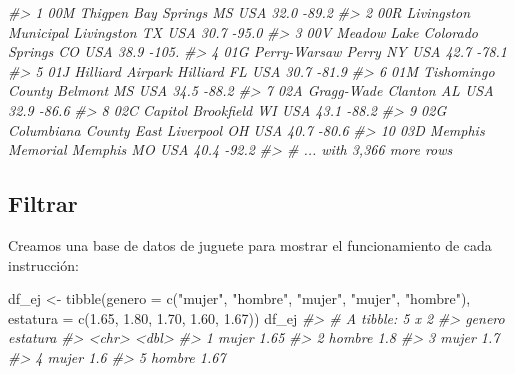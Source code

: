 \documentclass[
]{book}
\newenvironment{Shaded}{\begin{snugshade}}{\end{snugshade}}
\newcommand{\AttributeTok}[1]{\textcolor[rgb]{0.77,0.63,0.00}{#1}}
\newcommand{\CommentTok}[1]{\textcolor[rgb]{0.56,0.35,0.01}{\textit{#1}}}
\newcommand{\FloatTok}[1]{\textcolor[rgb]{0.00,0.00,0.81}{#1}}
\newcommand{\FunctionTok}[1]{\textcolor[rgb]{0.00,0.00,0.00}{#1}}
\newcommand{\NormalTok}[1]{#1}
\newcommand{\OtherTok}[1]{\textcolor[rgb]{0.56,0.35,0.01}{#1}}
\newcommand{\StringTok}[1]{\textcolor[rgb]{0.31,0.60,0.02}{#1}}
\begin{document}
\begin{Shaded}
\begin{Highlighting}[]
\CommentTok{\#\textgreater{}  1 00M   Thigpen              Bay Springs      MS    USA      32.0  {-}89.2}
\CommentTok{\#\textgreater{}  2 00R   Livingston Municipal Livingston       TX    USA      30.7  {-}95.0}
\CommentTok{\#\textgreater{}  3 00V   Meadow Lake          Colorado Springs CO    USA      38.9 {-}105. }
\CommentTok{\#\textgreater{}  4 01G   Perry{-}Warsaw         Perry            NY    USA      42.7  {-}78.1}
\CommentTok{\#\textgreater{}  5 01J   Hilliard Airpark     Hilliard         FL    USA      30.7  {-}81.9}
\CommentTok{\#\textgreater{}  6 01M   Tishomingo County    Belmont          MS    USA      34.5  {-}88.2}
\CommentTok{\#\textgreater{}  7 02A   Gragg{-}Wade           Clanton          AL    USA      32.9  {-}86.6}
\CommentTok{\#\textgreater{}  8 02C   Capitol              Brookfield       WI    USA      43.1  {-}88.2}
\CommentTok{\#\textgreater{}  9 02G   Columbiana County    East Liverpool   OH    USA      40.7  {-}80.6}
\CommentTok{\#\textgreater{} 10 03D   Memphis Memorial     Memphis          MO    USA      40.4  {-}92.2}
\CommentTok{\#\textgreater{} \# ... with 3,366 more rows}
\end{Highlighting}
\end{Shaded}

\hypertarget{filtrar}{%
\subsection*{Filtrar}\label{filtrar}}

Creamos una base de datos de juguete para mostrar el funcionamiento de cada
instrucción:

\begin{Shaded}
\begin{Highlighting}[]
\NormalTok{df\_ej }\OtherTok{\textless{}{-}} \FunctionTok{tibble}\NormalTok{(}\AttributeTok{genero =} \FunctionTok{c}\NormalTok{(}\StringTok{"mujer"}\NormalTok{, }\StringTok{"hombre"}\NormalTok{, }\StringTok{"mujer"}\NormalTok{, }\StringTok{"mujer"}\NormalTok{, }\StringTok{"hombre"}\NormalTok{), }
  \AttributeTok{estatura =} \FunctionTok{c}\NormalTok{(}\FloatTok{1.65}\NormalTok{, }\FloatTok{1.80}\NormalTok{, }\FloatTok{1.70}\NormalTok{, }\FloatTok{1.60}\NormalTok{, }\FloatTok{1.67}\NormalTok{))}
\NormalTok{df\_ej}
\CommentTok{\#\textgreater{} \# A tibble: 5 x 2}
\CommentTok{\#\textgreater{}   genero estatura}
\CommentTok{\#\textgreater{}   \textless{}chr\textgreater{}     \textless{}dbl\textgreater{}}
\CommentTok{\#\textgreater{} 1 mujer      1.65}
\CommentTok{\#\textgreater{} 2 hombre     1.8 }
\CommentTok{\#\textgreater{} 3 mujer      1.7 }
\CommentTok{\#\textgreater{} 4 mujer      1.6 }
\CommentTok{\#\textgreater{} 5 hombre     1.67}
\end{Highlighting}
\end{Shaded}
\end{document}
